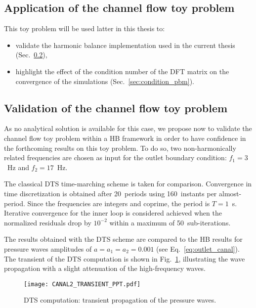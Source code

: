 \subsection{Application of the channel flow toy problem}

This toy problem will be used latter in this thesis to:
\begin{itemize} \itemsep0pt \parskip0pt
  \item validate the harmonic balance implementation
  used in the current thesis (Sec.~\ref{sec:channel_multifreq}),
  \item highlight the effect of the condition number of the
  DFT matrix on the convergence of the simulations (Sec.~\ref{sec:condition_pbm}).
\end{itemize}

\subsection{Validation of the channel flow toy problem}
\label{sec:channel_multifreq}

As no analytical solution is available for this case, we propose
now to validate the channel flow toy problem within a HB framework
in order to have confidence in the forthcoming results on this
toy problem.
To do so, two non-harmonically related
frequencies are chosen as input for the outlet boundary condition:
$f_1 = 3$~Hz and $f_2 = 17$~Hz.

The classical DTS time-marching scheme is taken for comparison.
Convergence in time discretization is obtained after 20~periods using
160~instants per almost-period. Since the frequencies are integers and
coprime, the period is $T=1$~s.  Iterative convergence for the
inner loop is considered achieved when the normalized residuals drop
by $10^{-2}$ within a maximum of 50~sub-iterations.

The results obtained with the DTS scheme are compared to the HB
results for pressure waves amplitudes of $a = a_1 = a_2 = 0.001$
(see Eq.~\eqref{eq:outlet_canal}).  The
transient of the DTS computation is shown in
Fig.~\ref{fig:canal2_transient}, illustrating the wave propagation
with a slight attenuation of the high-frequency waves.
\begin{figure}
  \centering
  \texttt{[image: CANAL2\_TRANSIENT\_PPT.pdf]}
  \caption{DTS computation: transient propagation of the pressure waves.}
  \label{fig:canal2_transient}
\end{figure}

